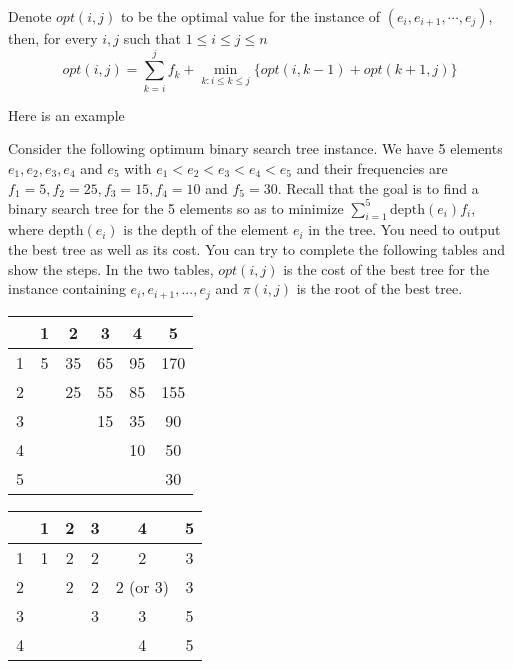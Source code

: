 					Denote $opt(i, j)$ to be the optimal value for the instance of $(e_i, e_{i + 1}, \cdots, e_j)$, then, for every $i, j$ such that $1 \le i \le j \le n$
					\begin{equation}
						opt(i, j) = \sum_{k = i}^j f_k + \min_{k:i \le k \le j}\{opt(i, k - 1) + opt(k + 1, j)\}
					\end{equation}

					Here is an example
					\begin{example}
						Consider the following optimum binary search tree instance. We have 5 elements $e_1, e_2, e_3, e_4$ and $e_5$ with $e_1 < e_2 < e_3 < e_4 < e_5$ and their frequencies are $f_1 = 5, f_2 = 25, f_3 = 15, f_4 = 10$ and $f_5 = 30$.  Recall that the goal is to find a binary search tree for the 5 elements so as to minimize $\sum_{i=1}^5 \textrm{depth}(e_i) f_i$, where $\textrm{depth}(e_i)$ is the depth of the element $e_i$ in the tree.  You need to output the best tree as well as its cost. You can try to complete the following tables and show the steps.  In the two tables, $opt(i,j)$ is the cost of the best tree for the instance containing $e_i, e_{i+1}, ..., e_j$ and $\pi(i, j)$ is the root of the best tree.
						\begin{table}[H]
							\centering
							\begin{tabular}{|c|c|c|c|c|c|}
								\hline
								\backslashbox{$i$}{$opt(i, j)$}{$j$} &  1 & 2  & 3 & 4 & 5 \\ \hline
								1 & 5 & 35 & 65 & 95 & 170\\\hline
								2&  & 25 & 55 & 85 & 155 \\\cline{1-1}\cline{3-6}
								3& \multicolumn{2}{c|}{} & 15 & 35 & 90\\\cline{1-1}\cline{4-6}
								4& \multicolumn{3}{c|}{} & 10 & 50 \\\cline{1-1}\cline{5-6}
								5& \multicolumn{4}{c|}{} & 30 \\\cline{1-1}\cline{6-6}
							\end{tabular}\qquad\qquad
							\begin{tabular}{|c|c|c|c|c|c|}
								\hline
								\backslashbox{$i$}{$\pi(i, j)$}{$j$} &  1 & 2  & 3 & 4 & 5 \\ \hline
								1 & 1 & 2 & 2 & 2 & 3\\\hline
								2&  & 2 & 2 & 2 (or 3)& 3 \\\cline{1-1}\cline{3-6}
								3& \multicolumn{2}{c|}{} & 3 & 3& 5\\\cline{1-1}\cline{4-6}
								4& \multicolumn{3}{c|}{} & 4 & 5\\\cline{1-1}\cline{5-6}

\end{tabular}
\end{table}
\end{example}
